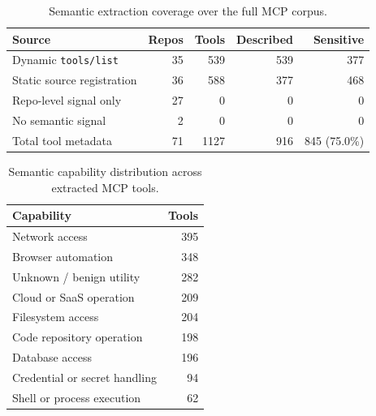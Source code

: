 
\begin{table}[t]
\centering
\caption{Semantic extraction coverage over the full MCP corpus.}
\label{tab:semantic-full-coverage}
\begin{tabular}{lrrrr}
\toprule
Source & Repos & Tools & Described & Sensitive \\
\midrule
Dynamic \texttt{tools/list} & 35 & 539 & 539 & 377 \\
Static source registration & 36 & 588 & 377 & 468 \\
Repo-level signal only & 27 & 0 & 0 & 0 \\
No semantic signal & 2 & 0 & 0 & 0 \\
\midrule
Total tool metadata & 71 & 1127 & 916 & 845 (75.0\%) \\
\bottomrule
\end{tabular}
\end{table}

\begin{table}[t]
\centering
\caption{Semantic capability distribution across extracted MCP tools.}
\label{tab:semantic-full-capabilities}
\begin{tabular}{lr}
\toprule
Capability & Tools \\
\midrule
Network access & 395 \\
Browser automation & 348 \\
Unknown / benign utility & 282 \\
Cloud or SaaS operation & 209 \\
Filesystem access & 204 \\
Code repository operation & 198 \\
Database access & 196 \\
Credential or secret handling & 94 \\
Shell or process execution & 62 \\
\bottomrule
\end{tabular}
\end{table}
